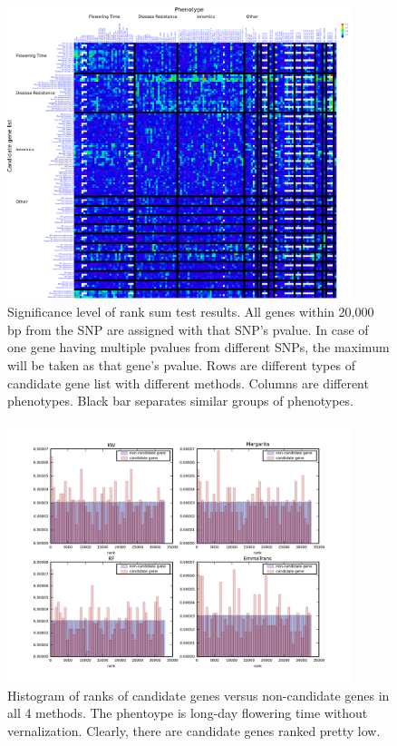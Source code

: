 \documentclass[a4paper,10pt]{article}
\begin{document}
\begin{figure}
  \includegraphics[width=0.9\textwidth]{figures/rank_sum_test_call_method_17_m20000_inkscape.png}
  \caption{Significance level of rank sum test results. All genes within 20,000 bp from the SNP are assigned with that SNP's pvalue. In case of one gene having multiple pvalues from different SNPs, the maximum will be taken as that gene's pvalue. Rows are different types of candidate gene list with different methods. Columns are different phenotypes. Black bar separates similar groups of phenotypes.}\label{f1}
\end{figure}

\begin{figure}
  \includegraphics[width=0.9\textwidth]{figures/1_LD_28_FT_list3_rank.png}
  \caption{Histogram of ranks of candidate genes versus non-candidate genes in all 4 methods. The phentoype is long-day flowering time without vernalization. Clearly, there are candidate genes ranked pretty low.}\label{f2}
\end{figure}
\end{document}
